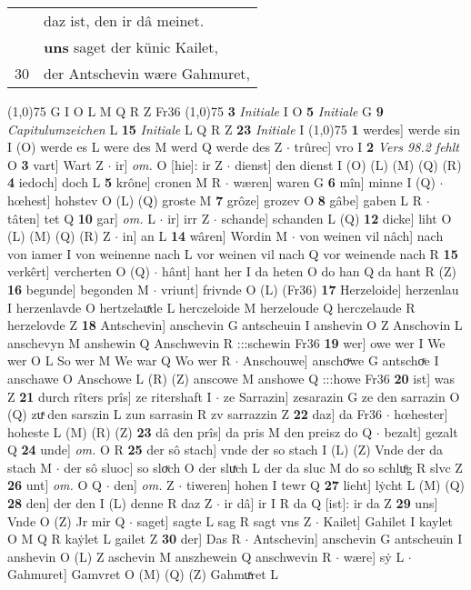 \documentclass[8pt,a4paper,notitlepage]{article}
\begin{document}
\begin{table}[ht]
\begin{minipage}[t]{0.5\linewidth}
\begin{tabular}{rl}
 & daz ist, den ir dâ meinet.\\ 
 & \textbf{uns} saget der künic Kailet,\\ 
30 & der Antschevin wære Gahmuret,\\ 
\end{tabular}
\scriptsize
\line(1,0){75} \newline
G I O L M Q R Z Fr36 \newline
\line(1,0){75} \newline
\textbf{3} \textit{Initiale} I O  \textbf{5} \textit{Initiale} G  \textbf{9} \textit{Capitulumzeichen} L  \textbf{15} \textit{Initiale} L Q R Z  \textbf{23} \textit{Initiale} I  \newline
\line(1,0){75} \newline
\textbf{1} werdes] werde sin I (O) werde es L were des M werd Q werde des Z  $\cdot$ trûrec] vro I \textbf{2} \textit{Vers 98.2 fehlt} O  \textbf{3} vart] Wart Z  $\cdot$ ir] \textit{om.} O [hie]: ir Z  $\cdot$ dienst] den dienst I (O) (L) (M) (Q) (R) \textbf{4} iedoch] doch L \textbf{5} krône] cronen M R  $\cdot$ wæren] waren G \textbf{6} mîn] minne I (Q)  $\cdot$ hœhest] hohstev O (L) (Q) groste M \textbf{7} grôze] grozev O \textbf{8} gâbe] gaben L R  $\cdot$ tâten] tet Q \textbf{10} gar] \textit{om.} L  $\cdot$ ir] irr Z  $\cdot$ schande] schanden L (Q) \textbf{12} dicke] liht O (L) (M) (Q) (R) Z  $\cdot$ in] an L \textbf{14} wâren] Wordin M  $\cdot$ von weinen vil nâch] nach von iamer I von weinenne nach L vor weinen vil nach Q vor weinende nach R \textbf{15} verkêrt] vercherten O (Q)  $\cdot$ hânt] hant her I da heten O do han Q da hant R (Z) \textbf{16} begunde] begonden M  $\cdot$ vriunt] frivnde O (L) (Fr36) \textbf{17} Herzeloide] herzenlau I herzenlavde O hertzelauͯde L herczeloide M herzeloude Q herczelaude R herzelovde Z \textbf{18} Antschevin] anschevin G antscheuin I anshevin O Z Anschovin L anschevyn M anshewin Q Anschwevin R :::schewin Fr36 \textbf{19} wer] owe wer I We wer O L So wer M We war Q Wo wer R  $\cdot$ Anschouwe] anschoͮwe G antschoͮe I anschawe O Anschowe L (R) (Z) anscowe M anshowe Q :::howe Fr36 \textbf{20} ist] was Z \textbf{21} durch rîters prîs] ze ritershaft I  $\cdot$ ze Sarrazin] zesarazin G ze den sarrazin O (Q) zuͯ den sarszin L zun sarrasin R zv sarrazzin Z \textbf{22} daz] da Fr36  $\cdot$ hœhester] hoheste L (M) (R) (Z) \textbf{23} dâ den prîs] da pris M den preisz do Q  $\cdot$ bezalt] gezalt Q \textbf{24} unde] \textit{om.} O R \textbf{25} der sô stach] vnde der so stach I (L) (Z) Vnde der da stach M  $\cdot$ der sô sluoc] so sloͮch O der sluͯch L der da sluc M do so schluͦg R slvc Z \textbf{26} unt] \textit{om.} O Q  $\cdot$ den] \textit{om.} Z  $\cdot$ tiweren] hohen I tewr Q \textbf{27} lieht] lẏcht L (M) (Q) \textbf{28} den] der den I (L) denne R daz Z  $\cdot$ ir dâ] ir I R da Q [ist]: ir da Z \textbf{29} uns] Vnde O (Z) Jr mir Q  $\cdot$ saget] sagte L sag R sagt vns Z  $\cdot$ Kailet] Gahilet I kaylet O M Q R kaẏlet L gailet Z \textbf{30} der] Das R  $\cdot$ Antschevin] anschevin G antscheuin I anshevin O (L) Z aschevin M anszhewein Q anschwevin R  $\cdot$ wære] sẏ L  $\cdot$ Gahmuret] Gamvret O (M) (Q) (Z) Gahmuͯret L \newline

\end{minipage}
\end{table}
\end{document}

